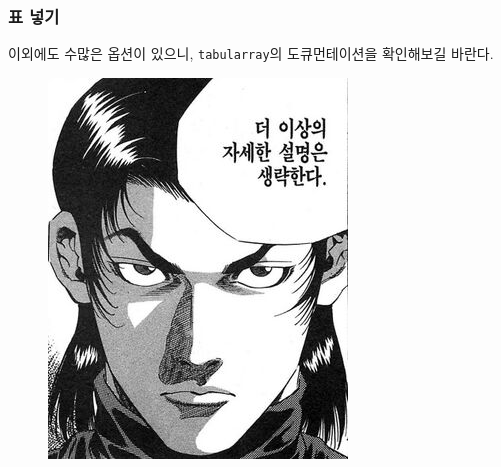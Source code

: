 \begin{frame}
    \frametitle{표 넣기}

    이외에도 수많은 옵션이 있으니, \texttt{tabularray}의 도큐먼테이션을 확인해보길 바란다.

    \begin{figure}
        \centering
        \includegraphics[height=0.7\textheight]{noexplanation.jpg}
    \end{figure}

\end{frame}


